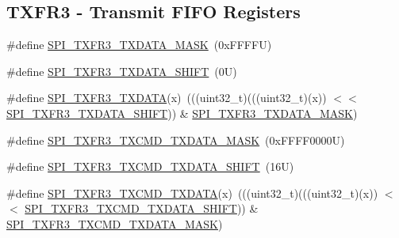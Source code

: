 \subsection*{T\+X\+F\+R3 -\/ Transmit F\+I\+FO Registers}
\begin{DoxyCompactItemize}
\item 
\#define \mbox{\hyperlink{group___s_p_i___register___masks_gac55f871f2a4bd1462049674e1b69d771}{S\+P\+I\+\_\+\+T\+X\+F\+R3\+\_\+\+T\+X\+D\+A\+T\+A\+\_\+\+M\+A\+SK}}~(0x\+F\+F\+F\+F\+U)
\item 
\#define \mbox{\hyperlink{group___s_p_i___register___masks_ga13d115127f0f26ef2f4afac9d4fcafd9}{S\+P\+I\+\_\+\+T\+X\+F\+R3\+\_\+\+T\+X\+D\+A\+T\+A\+\_\+\+S\+H\+I\+FT}}~(0\+U)
\item 
\#define \mbox{\hyperlink{group___s_p_i___register___masks_ga49209a3863af39f655a385ddd5b917c4}{S\+P\+I\+\_\+\+T\+X\+F\+R3\+\_\+\+T\+X\+D\+A\+TA}}(x)~(((uint32\+\_\+t)(((uint32\+\_\+t)(x)) $<$$<$ \mbox{\hyperlink{group___s_p_i___register___masks_ga13d115127f0f26ef2f4afac9d4fcafd9}{S\+P\+I\+\_\+\+T\+X\+F\+R3\+\_\+\+T\+X\+D\+A\+T\+A\+\_\+\+S\+H\+I\+FT}})) \& \mbox{\hyperlink{group___s_p_i___register___masks_gac55f871f2a4bd1462049674e1b69d771}{S\+P\+I\+\_\+\+T\+X\+F\+R3\+\_\+\+T\+X\+D\+A\+T\+A\+\_\+\+M\+A\+SK}})
\item 
\#define \mbox{\hyperlink{group___s_p_i___register___masks_ga5db2d61f529d80173f78729f46c098a9}{S\+P\+I\+\_\+\+T\+X\+F\+R3\+\_\+\+T\+X\+C\+M\+D\+\_\+\+T\+X\+D\+A\+T\+A\+\_\+\+M\+A\+SK}}~(0x\+F\+F\+F\+F0000\+U)
\item 
\#define \mbox{\hyperlink{group___s_p_i___register___masks_ga22a70393315807bfa3480a1892da3531}{S\+P\+I\+\_\+\+T\+X\+F\+R3\+\_\+\+T\+X\+C\+M\+D\+\_\+\+T\+X\+D\+A\+T\+A\+\_\+\+S\+H\+I\+FT}}~(16\+U)
\item 
\#define \mbox{\hyperlink{group___s_p_i___register___masks_gabd1aff6c08d7a7334407f5a122fb2684}{S\+P\+I\+\_\+\+T\+X\+F\+R3\+\_\+\+T\+X\+C\+M\+D\+\_\+\+T\+X\+D\+A\+TA}}(x)~(((uint32\+\_\+t)(((uint32\+\_\+t)(x)) $<$$<$ \mbox{\hyperlink{group___s_p_i___register___masks_ga22a70393315807bfa3480a1892da3531}{S\+P\+I\+\_\+\+T\+X\+F\+R3\+\_\+\+T\+X\+C\+M\+D\+\_\+\+T\+X\+D\+A\+T\+A\+\_\+\+S\+H\+I\+FT}})) \& \mbox{\hyperlink{group___s_p_i___register___masks_ga5db2d61f529d80173f78729f46c098a9}{S\+P\+I\+\_\+\+T\+X\+F\+R3\+\_\+\+T\+X\+C\+M\+D\+\_\+\+T\+X\+D\+A\+T\+A\+\_\+\+M\+A\+SK}})
\end{DoxyCompactItemize}
